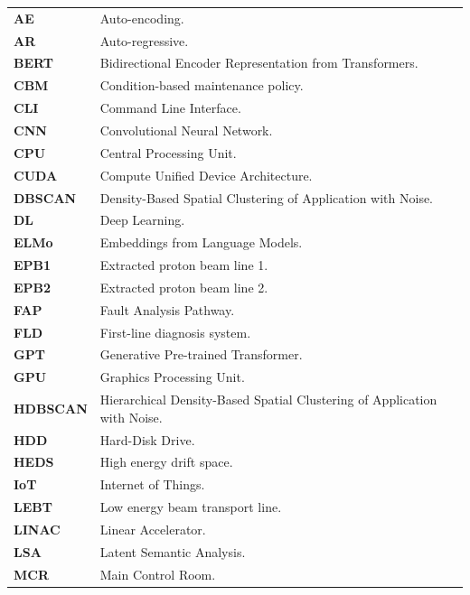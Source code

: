 \documentclass[10pt,oneside]{report}
\begin{document}
\begin{table}[ht]
    \centering
    \begin{tabular}{ll}

        \textbf{AE} & Auto-encoding. \\
        \textbf{AR} & Auto-regressive. \\
        \textbf{BERT} & Bidirectional Encoder Representation from Transformers. \\
        \textbf{CBM} & Condition-based maintenance policy. \\
        \textbf{CLI} & Command Line Interface. \\
        \textbf{CNN} & Convolutional Neural Network. \\
        \textbf{CPU} & Central Processing Unit. \\
        \textbf{CUDA} & Compute Unified Device Architecture. \\
        \textbf{DBSCAN} & Density-Based Spatial Clustering of Application with Noise. \\
        \textbf{DL} & Deep Learning. \\
        \textbf{ELMo} & Embeddings from Language Models. \\
        \textbf{EPB1} & Extracted proton beam line 1. \\
        \textbf{EPB2} & Extracted proton beam line 2. \\
        \textbf{FAP} & Fault Analysis Pathway. \\
        \textbf{FLD} & First-line diagnosis system. \\
        \textbf{GPT} & Generative Pre-trained Transformer. \\
        \textbf{GPU} & Graphics Processing Unit. \\
        \textbf{HDBSCAN} & Hierarchical Density-Based Spatial Clustering of Application with Noise. \\
        \textbf{HDD} & Hard-Disk Drive. \\
        \textbf{HEDS} & High energy drift space. \\
        \textbf{IoT} & Internet of Things. \\
        \textbf{LEBT} & Low energy beam transport line. \\
        \textbf{LINAC} & Linear Accelerator. \\
        \textbf{LSA} & Latent Semantic Analysis. \\
        \textbf{MCR} & Main Control Room. \\

\end{tabular}
\end{table}
\end{document}
